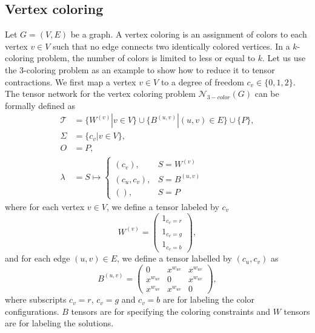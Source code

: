 \documentclass[review, onefignum, onetabnum]{siamart190516}
\begin{document}
\subsection{Vertex coloring}
Let $G=(V,E)$ be a graph. A vertex coloring is an assignment of colors to each vertex $v\in V$ such that no edge connects two identically colored vertices. 
In a $k$-coloring problem, the number of colors is limited to less or equal to $k$.
Let us use the 3-coloring problem as an example to show how to reduce it to tensor contractions.
We first map a vertex $v \in V$ to a degree of freedom $c_v\in\{0,1,2\}$.
The tensor network for the vertex coloring problem $\mathcal{N}_{3-color}(G)$ can be formally defined as
\begin{equation}\label{eq:colortensornetwork}
\begin{split}
    \mathcal{T} &= \{W^{(v)} | v\in V\} \cup \{B^{(u, v)} | (u, v) \in E\} \cup \{P\},\\
    \Sigma &= \{c_v | v \in V\},\\
    O &= P,\\
    \lambda &= S \mapsto \begin{cases}
                    (c_v), & S = W^{(v)}\\
                    (c_u, c_v), & S = B^{(u, v)}\\
                    (), & S = P
                    \end{cases}
\end{split}
\end{equation}
where for each vertex $v \in V$, we define a tensor labeled by $c_v$
\begin{equation}
    W^{(v)} = \left(\begin{matrix}
        1_{c_{v} = r}\\
        1_{c_{v} = g}\\
        1_{c_{v} = b}
    \end{matrix}\right),
\end{equation}
and for each edge $(u, v) \in E$, we define a tensor labelled by $(c_u, c_v)$ as
\begin{equation}
    B^{(u, v)} = \left(\begin{matrix}
        0 & x^{w_{uv}} & x^{w_{uv}}\\
        x^{w_{uv}} & 0 & x^{w_{uv}}\\
        x^{w_{uv}} & x^{w_{uv}} & 0
    \end{matrix}\right),
\end{equation}
where subscripts $c_v = r$, $c_v = g$ and $c_v = b$ are for labeling the color configurations. $B$ tensors are for specifying the coloring constraints and $W$ tensors are for labeling the solutions.
\end{document}
